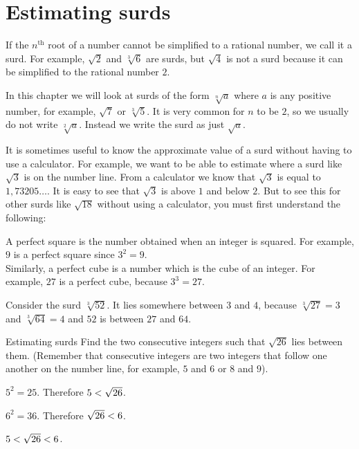 \section{Estimating surds}
\setcounter{figure}{1}
\setcounter{subfigure}{1}
If the ${n}^{\mathrm{th}}$ root of a number cannot be simplified to a rational number, we call it a surd. For example, $\sqrt{2}$ and $\sqrt[3]{6}$ are surds, but $\sqrt{4}$ is not a surd because it can be simplified to the rational number $2$.\par 
In this chapter we will look at surds of the form $\sqrt[n]{a}$ where $a$ is any positive number, for example, $\sqrt{7}$ or $\sqrt[3]{5}$. It is very common for $n$ to be $2$, so we usually do not write $\sqrt[2]{a}$. Instead we write the surd as just $\sqrt{a}$.\par 
It is sometimes useful to know the approximate value of a surd without having to use a calculator. For example, we want to be able to estimate where a surd like $\sqrt{3}$ is on the number line. From a calculator we know that $\sqrt{3}$ is equal to $1,73205\ldots$. It is easy to see that $\sqrt{3}$ is above $1$ and below $2$. But to see this for other surds like $\sqrt{18}$ without using a calculator, you must first understand the following:\par 



\par
A perfect square is the number obtained when an integer is squared. For example, $9$ is a perfect square since ${3}^{2}=9$. \\Similarly, a perfect cube is a number which is the cube of an integer. For example, $27$ is a perfect cube, because ${3}^{3}=27$.
\par
Consider the surd $\sqrt[3]{52}$. It lies somewhere between $3$ and $4$, because $\sqrt[3]{27}=3$ and $\sqrt[3]{64}=4$ and $52$ is between $27$ and $64$. %

\begin{wex}{Estimating surds}
{%
Find the two consecutive integers such that $\sqrt{26}$ lies between them.
(Remember that consecutive integers are two integers that follow one
another on the number line, for example, $5$ and $6$ or $8$ and $9$).
}
{%

${5}^{2}=25$. Therefore $5<{}\sqrt{26}$.

${6}^{2}=36$. 
Therefore $\sqrt{26}<{}6$.

$5<{}\sqrt{26}<{}6$. 
}
\end{wex}


